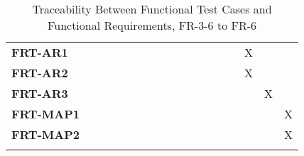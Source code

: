 \documentclass[12pt, titlepage]{article}
\begin{document}
\begin{landscape}
\begin{longtable}{|l|cccccccccccc|}
  \textbf{FRT-AR1}  & ~              & ~              & ~              & ~              & ~              & ~              & ~              & ~              & ~              & X              & ~               & ~              \\
  \textbf{FRT-AR2}  & ~              & ~              & ~              & ~              & ~              & ~              & ~              & ~              & ~              & X              & ~               & ~              \\
  \textbf{FRT-AR3}  & ~              & ~              & ~              & ~              & ~              & ~              & ~              & ~              & ~              & ~              & X               & ~              \\
  \textbf{FRT-MAP1} & ~              & ~              & ~              & ~              & ~              & ~              & ~              & ~              & ~              & ~              & ~               & X              \\
  \textbf{FRT-MAP2} & ~              & ~              & ~              & ~              & ~              & ~              & ~              & ~              & ~              & ~              & ~               & X              \\
  \hline
  \caption{Traceability Between Functional Test Cases and Functional Requirements, FR-3-6 to FR-6} \\
\end{longtable}

\newpage


\end{landscape}
\end{document}
